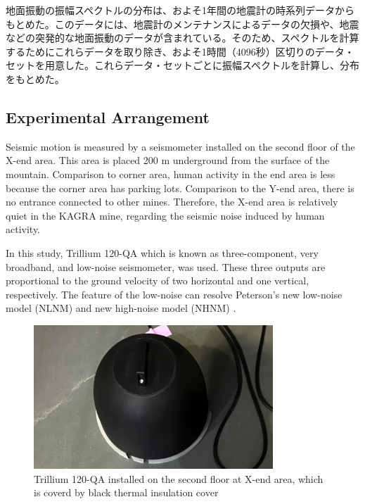 地面振動の振幅スペクトルの分布は、およそ1年間の地震計の時系列データからもとめた。このデータには、地震計のメンテナンスによるデータの欠損や、地震などの突発的な地面振動のデータが含まれている。そのため、スペクトルを計算するためにこれらデータを取り除き、およそ1時間（4096秒）区切りのデータ・セットを用意した。これらデータ・セットごとに振幅スペクトルを計算し、分布をもとめた。

\subsection{Experimental Arrangement}
Seismic motion is measured by a seismometer installed on the second floor of the X-end area. This area is placed 200 $\mathrm{m}$ underground from the surface of the mountain. Comparison to corner area, human activity in the end area is less because the corner area has parking lots. Comparison to the Y-end area, there is no entrance connected to other mines. Therefore, the X-end area is relatively quiet in the KAGRA mine, regarding the seismic noise induced by human activity.

In this study, Trillium 120-QA which is known as three-component, very broadband, and low-noise seismometer, was used. These three outputs are proportional to the ground velocity of two horizontal and one vertical, respectively. The feature of the low-noise can resolve  Peterson's new low-noise model (NLNM) and new high-noise model (NHNM) \cite{peterson1993observations}.

\begin{figure}[h]
  \begin{center}   
    \includegraphics[width=9.0cm]{./img_chap3/img316.png}
    \caption{Trillium 120-QA installed on the second floor at X-end area, which is coverd by black thermal insulation cover}\label{img:img316}
  \end{center}
\end{figure}

